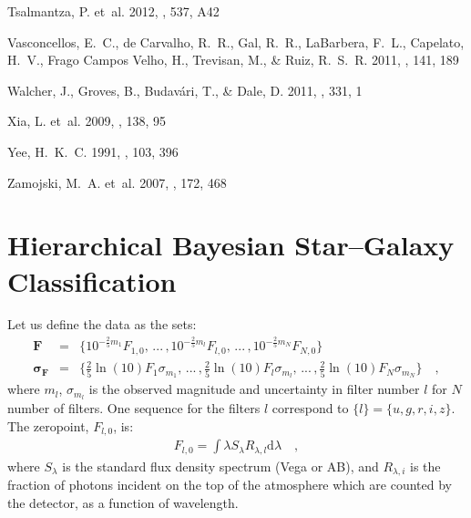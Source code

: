 \documentclass[12pt,preprint]{aastex}
\newcommand{\datavector}[1]{\boldsymbol{#1}}
\newcommand{\flux}{\datavector{F}}
\newcommand{\uncertainty}{\datavector{\sigma_F}}
\newcommand{\dd}{\mathrm{d}}
\begin{document}
\begin{thebibliography}{39}
{Tsalmantza}, P. {et~al.} 2012, \aap, 537, A42

{Vasconcellos}, E.~C., {de Carvalho}, R.~R., {Gal}, R.~R., {LaBarbera}, F.~L.,
  {Capelato}, H.~V., {Frago Campos Velho}, H., {Trevisan}, M., \& {Ruiz},
  R.~S.~R. 2011, \aj, 141, 189

{Walcher}, J., {Groves}, B., {Budav{\'a}ri}, T., \& {Dale}, D. 2011, \apss,
  331, 1

{Xia}, L. {et~al.} 2009, \aj, 138, 95

{Yee}, H.~K.~C. 1991, \pasp, 103, 396

{Zamojski}, M.~A. {et~al.} 2007, \apjs, 172, 468

\end{thebibliography}


\appendix
\section{Hierarchical Bayesian Star--Galaxy Classification}

Let us define the data as the sets:
\footnotesize
\begin{eqnarray}\displaystyle
\flux & = & \{10^{-\frac{2}{5}m_1}F_{1,0},\,...\,,10^{-\frac{2}{5}m_l}F_{l,0},\,...\,,10^{-\frac{2}{5}m_N}F_{N,0}\}
\nonumber\\
\uncertainty & = & \{\frac{2}{5}\ln(10)F_1\sigma_{m_1},\,...\,,\frac{2}{5}\ln(10)F_l\sigma_{m_l},\,...\,,\frac{2}{5}\ln(10)F_N\sigma_{m_N}\}
\quad ,
\end{eqnarray}
\normalsize
\noindent where $m_l$, $\sigma_{m_l}$ is the observed magnitude and 
uncertainty in filter number $l$ for $N$ number of filters.  One  
sequence for the filters $l$ correspond to $\{l\}=\{u,g,r,i,z\}$. The 
zeropoint, $F_{l,0}$, is:
\begin{eqnarray}\displaystyle
F_{l,0}=\int \lambda S_\lambda R_{\lambda, l} \dd \lambda
\quad ,
\end{eqnarray}
where $S_\lambda$ is the standard flux density spectrum (Vega or AB), and 
$R_{\lambda,i}$ is the fraction of photons incident on the top 
of the atmosphere which are counted by the detector, as a function 
of wavelength.
\end{document}
